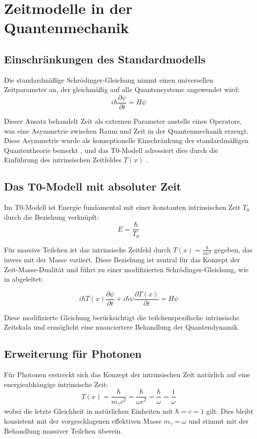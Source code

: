 \documentclass[12pt,a4paper]{article}
\newcommand{\Tfield}{T(x)}
\begin{document}
	\section{Zeitmodelle in der Quantenmechanik}
	\subsection{Einschränkungen des Standardmodells}
	Die standardmäßige Schrödinger-Gleichung nimmt einen universellen Zeitparameter an, der gleichmäßig auf alle Quantensysteme angewendet wird:
	\begin{equation}
		i\hbar\frac{\partial\psi}{\partial t} = H\psi
	\end{equation}
	
	Dieser Ansatz behandelt Zeit als externen Parameter anstelle eines Operators, was eine Asymmetrie zwischen Raum und Zeit in der Quantenmechanik erzeugt. Diese Asymmetrie wurde als konzeptionelle Einschränkung der standardmäßigen Quantentheorie bemerkt \cite{feynman}, und das T0-Modell adressiert dies durch die Einführung des intrinsischen Zeitfeldes \(\Tfield\) \cite{pascher_erweiterung_2025}.
	
	\subsection{Das T0-Modell mit absoluter Zeit}
	Im T0-Modell ist Energie fundamental mit einer konstanten intrinsischen Zeit \(T_0\) durch die Beziehung verknüpft:
	\begin{equation}
		E = \frac{\hbar}{T_0}
	\end{equation}
	
	Für massive Teilchen ist das intrinsische Zeitfeld durch \(\Tfield = \frac{\hbar}{m c^2}\) gegeben, das invers mit der Masse variiert. Diese Beziehung ist zentral für das Konzept der Zeit-Masse-Dualität und führt zu einer modifizierten Schrödinger-Gleichung, wie in \cite{pascher_lagrange_2025} abgeleitet:
	
	\begin{equation}
		i\hbar \Tfield \frac{\partial\psi}{\partial t} + i\hbar \psi \frac{\partial \Tfield}{\partial t} = H\psi
	\end{equation}
	
	Diese modifizierte Gleichung berücksichtigt die teilchenspezifische intrinsische Zeitskala und ermöglicht eine nuanciertere Behandlung der Quantendynamik.
	
	\subsection{Erweiterung für Photonen}
	Für Photonen erstreckt sich das Konzept der intrinsischen Zeit natürlich auf eine energieabhängige intrinsische Zeit:
	\begin{equation}
		\Tfield = \frac{\hbar}{m_\gamma c^2} = \frac{\hbar}{\omega c^2} = \frac{\hbar}{\omega} = \frac{1}{\omega}
	\end{equation}
	wobei die letzte Gleichheit in natürlichen Einheiten mit \(\hbar = c = 1\) gilt. Dies bleibt konsistent mit der vorgeschlagenen effektiven Masse \(m_\gamma = \omega\) und stimmt mit der Behandlung massiver Teilchen überein.
	
\end{document}
